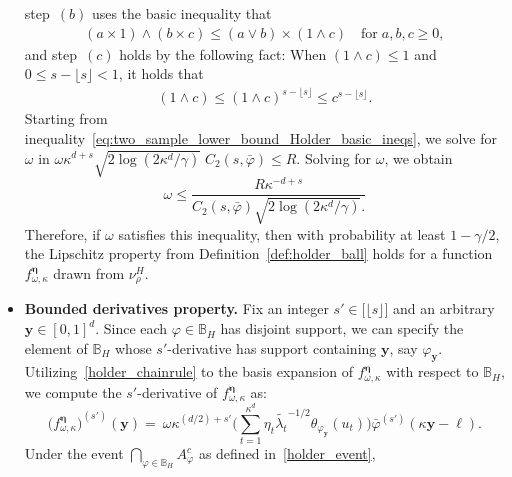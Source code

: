 \documentclass[twoside,11pt]{article}
\newcommand{\floor}[1]{\lfloor #1 \rfloor} %
\newcommand{\vectorize}[1]{\mathbf{#1}}
\newcommand{\dimDensity}{d} %
\newcommand{\smoothness}{s}
\newcommand{\ballRadius}{R}
\newcommand{\ONset}{\mathbb{B}}
\newcommand{\binNum}{\kappa}           %
\newcommand{\coef}{\theta}
\newcommand{\wavMotherUnivIndex}{\ell}
\newcommand{\wavMotherIndex}{\boldsymbol{\wavMotherUnivIndex}}
\newcommand{\domainTs}{
	[0,1]^{{\dimDensity}}
}
\begin{document}
\begin{appendix}
\begin{itemize}
	step~$(b)$ uses the basic inequality that
	\begin{align*}
		(a \times 1) \wedge (b \times c) \leq (a \vee b) \times (1 \wedge c)
		\quad \text{for} \; a,b,c \geq 0,
	\end{align*}
	and
	step~$(c)$ holds by the following fact:
	When $(1 \wedge c) \leq 1$
	and
	$0 \leq s- \floor{s} < 1$,
	it holds that
	\begin{align*}
		(1 \wedge c) \leq (1 \wedge c)^{s - \floor{s}} \leq c^{s - \floor{s}}.
	\end{align*}
	Starting from inequality~\eqref{eq:two_sample_lower_bound_Holder_basic_ineqs}, we solve for \(\omega\) in
	$
	\omega
	\kappa^{\dimDensity + s}
	\sqrt{2 \log(2{\binNum^{\dimDensity}}/\gamma)}
	\; C_2(s, \bar{\varphi}) \leq \ballRadius
	$.
	Solving for \(\omega\), we obtain
	\begin{equation}\label{condition_holder_lipschitz}
		\omega
		\leq
		\frac{\ballRadius \binNum^{-\dimDensity + \smoothness}}{
			C_2(s, \bar{\varphi})  \sqrt{2 \log(2{\binNum^{\dimDensity}}/\gamma)}.
		}
	\end{equation}
	Therefore, if \(\omega\) satisfies this inequality, then with probability at least \(1 - \gamma/2\), the Lipschitz property from Definition~\ref{def:holder_ball} holds for a function \(f^{{\boldsymbol{\eta}}}_{\omega, \binNum}\) drawn from \(\nu_\rho^H\).
	\noindent
	\item \textbf{Bounded derivatives property.}
	Fix an integer $s' \in \bigl[ \lfloor \smoothness \rfloor \bigr]$ and an arbitrary $\vectorize{y} \in \domainTs$.
	Since each $\varphi \in \ONset_{H}$ has disjoint support,
	we can specify the element of $\ONset_{H}$ whose $s'$-derivative has support containing  $\vectorize{y}$,
	say  $\varphi_{\vectorize{y}}$.
	Utilizing~\eqref{holder_chainrule} to the basis expansion of $f^{{\boldsymbol{\eta}}}_{\omega, \binNum}$ with respect to $\ONset_{H}$,
	we compute the $s'$-derivative of $f^{{\boldsymbol{\eta}}}_{\omega, \binNum}$ as:
	\begin{equation*}
		({f^{{\boldsymbol{\eta}}}_{\omega, \binNum})}^{(s')}(\vectorize{y})
		=~
		\omega
		\kappa^{(\dimDensity/2) + s'}
		\biggl(
		\sum_{t=1}^{\binNum^{\dimDensity}}
		\eta_t
		\tilde{\lambda_t}^{-1/2}
		\coef_{\varphi_{\vectorize{y}}}(u_t)
		\biggr)
		\bar{\varphi}
		^{(s')}
		(
		\kappa \vectorize{y} - \wavMotherIndex
		).
	\end{equation*}
	\noindent
	Under the event $\bigcap_{\varphi \in \ONset_H} A_\varphi^c$ as defined in~\eqref{holder_event},

\end{itemize}
\end{appendix}
\end{document}

